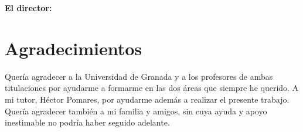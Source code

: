 \textbf{El director:}

\vspace{5cm}

\noindent \textbf{\myProf}

\chapter*{Agradecimientos}
\thispagestyle{empty}

       \vspace{1cm}


Quería agradecer a la Universidad de Granada y a los profesores de ambas titulaciones por ayudarme a formarme en las dos áreas que siempre he querido. A mi tutor, Héctor Pomares, por ayudarme además a realizar el presente trabajo.\\

Quería agradecer también a mi familia y amigos, sin cuya ayuda y apoyo inestimable no podría haber seguido adelante.

